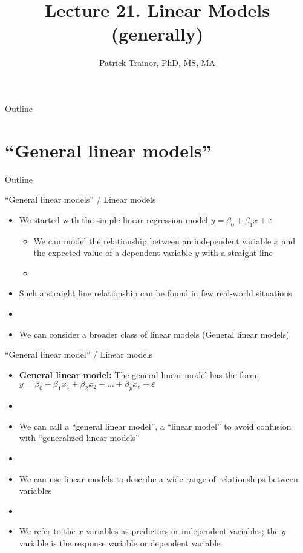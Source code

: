 \documentclass[xcolor=dvipsnames]{beamer}
\title[Lecture 21]{Lecture 21. Linear Models (generally)}
\author[Patrick Trainor]{Patrick Trainor, PhD, MS, MA}
\institute[NMSU]{New Mexico State University}
\date{}
\begin{document}
\begin{frame}
\maketitle
\end{frame}

\begin{frame}{Outline}
\tableofcontents[hideallsubsections]
\end{frame}

\section{``General linear models''}
\begin{frame}{Outline}
	\tableofcontents[currentsection,subsectionstyle=show/shaded/hide]
\end{frame}

\begin{frame}{``General linear models'' / Linear models}
	\begin{itemize}
		\item We started with the simple linear regression model $y = \beta_0 + \beta_1 x + \varepsilon$ \pause
		\begin{itemize}
			\item We can model the relationship between an independent variable $x$ and the expected value of a dependent variable $y$ with a straight line \pause
			\item[]
		\end{itemize}
		\item Such a straight line relationship can be found in few real-world situations \pause
		\item[]
		\item We can consider a broader class of linear models (General linear models) 
	\end{itemize}
\end{frame}

\begin{frame}{``General linear model'' / Linear models}
	\begin{itemize}
		\item \textbf{General linear model:} The general linear model has the form: $y = \beta_0 + \beta_1 x_1 + \beta_2 x_2 + \hdots + \beta_p x_p + \varepsilon$ \pause
		\item[]
		\item We can call a ``general linear model'', a ``linear model'' to avoid confusion with ``generalized linear models'' \pause
		\item[]
		\item We can use linear models to describe a wide range of relationships between variables \pause
		\item[]
		\item We refer to the $x$ variables as predictors or independent variables; the $y$ variable is the response variable or dependent variable
	\end{itemize}
\end{frame}
\end{document}
